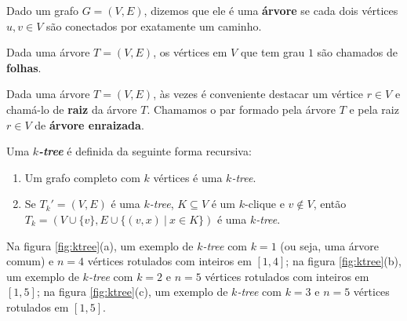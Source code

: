 \vspace{2em}

Dado um grafo $G = (V, E)$, dizemos que ele é uma \textbf{árvore} se cada dois vértices $u, v \in V$ são conectados por exatamente um caminho.

Dada uma árvore $T = (V, E)$, os vértices em $V$ que tem grau $1$ são chamados de \textbf{folhas}.

Dada uma árvore $T = (V, E)$, às vezes é conveniente destacar um vértice $r \in V$ e chamá-lo de \textbf{raiz} da árvore $T$. Chamamos o par formado pela árvore $T$ e pela raiz $r \in V$ de \textbf{árvore enraizada}.

\vspace{2em}

\begin{definition}
  \label{def:ktree}
  \cite{harary} Uma \textbf{\emph{$k$-tree}} é definida da seguinte forma recursiva:

  \begin{enumerate}
    \item Um grafo completo com $k$ vértices é uma \emph{$k$-tree}.
    \item Se $T_k' = (V, E)$ é uma \emph{$k$-tree}, $K \subseteq V$ é um $k$-clique e $v \not \in V$, então $T_k = (V \cup \{v\}, E \cup \{(v,x) \ | \  x \in K\})$ é uma \emph{$k$-tree}.
  \end{enumerate}

  Na figura \ref{fig:ktree}(a), um exemplo de \emph{$k$-tree} com $k = 1$ (ou seja, uma árvore comum) e $n = 4$ vértices rotulados com inteiros em $[1, 4]$; na figura \ref{fig:ktree}(b), um exemplo de \emph{$k$-tree} com $k = 2$ e $n = 5$ vértices rotulados com inteiros em $[1, 5]$; na figura \ref{fig:ktree}(c), um exemplo de \emph{$k$-tree} com $k = 3$ e $n = 5$ vértices rotulados em $[1, 5]$.

  \begin{figure}
    \begin{minipage}{0.3333\textwidth}
      \centering


\end{minipage}
\end{figure}
\end{definition}
